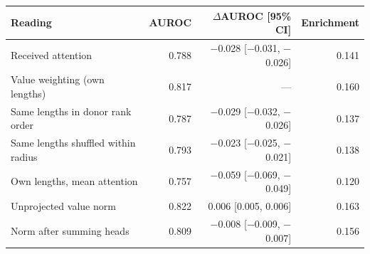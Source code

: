 \begin{tabular}{@{}lrrr@{}}
\toprule
Reading & AUROC & $\Delta$AUROC [95\% CI] & Enrichment \\
\midrule
Received attention & 0.788 & $-$0.028 [$-$0.031, $-$0.026] & 0.141 \\
Value weighting (own lengths) & 0.817 & --- & 0.160 \\
Same lengths in donor rank order & 0.787 & $-$0.029 [$-$0.032, $-$0.026] & 0.137 \\
Same lengths shuffled within radius & 0.793 & $-$0.023 [$-$0.025, $-$0.021] & 0.138 \\
Own lengths, mean attention & 0.757 & $-$0.059 [$-$0.069, $-$0.049] & 0.120 \\
Unprojected value norm & 0.822 & 0.006 [0.005, 0.006] & 0.163 \\
Norm after summing heads & 0.809 & $-$0.008 [$-$0.009, $-$0.007] & 0.156 \\
\bottomrule
\end{tabular}
